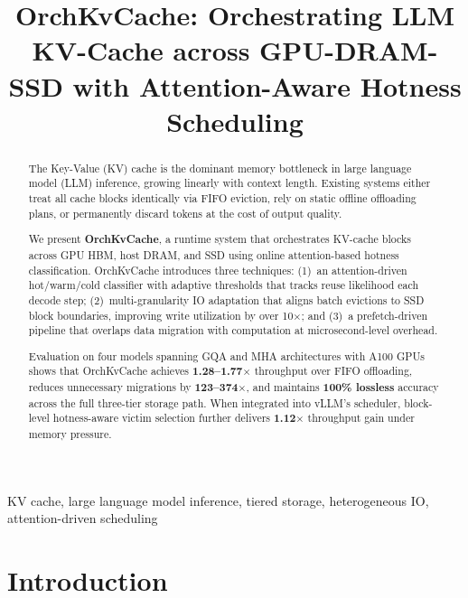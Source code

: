 \documentclass[conference]{IEEEtran}
\begin{document}
\title{OrchKvCache: Orchestrating LLM KV-Cache across GPU-DRAM-SSD with Attention-Aware Hotness Scheduling}

\author{
}

\maketitle

\begin{abstract}
The Key-Value (KV) cache is the dominant memory bottleneck in large language model (LLM) inference, growing linearly with context length. Existing systems either treat all cache blocks identically via FIFO eviction, rely on static offline offloading plans, or permanently discard tokens at the cost of output quality.

We present \textbf{OrchKvCache}, a runtime system that orchestrates KV-cache blocks across GPU HBM, host DRAM, and SSD using online attention-based hotness classification. OrchKvCache introduces three techniques: (1)~an attention-driven hot/warm/cold classifier with adaptive thresholds that tracks reuse likelihood each decode step; (2)~multi-granularity IO adaptation that aligns batch evictions to SSD block boundaries, improving write utilization by over 10$\times$; and (3)~a prefetch-driven pipeline that overlaps data migration with computation at microsecond-level overhead.

Evaluation on four models spanning GQA and MHA architectures with A100 GPUs shows that OrchKvCache achieves \textbf{1.28--1.77$\times$} throughput over FIFO offloading, reduces unnecessary migrations by \textbf{123--374$\times$}, and maintains \textbf{100\% lossless} accuracy across the full three-tier storage path. When integrated into vLLM's scheduler, block-level hotness-aware victim selection further delivers \textbf{1.12$\times$} throughput gain under memory pressure.
\end{abstract}

\begin{IEEEkeywords}
KV cache, large language model inference, tiered storage, heterogeneous IO, attention-driven scheduling
\end{IEEEkeywords}

\section{Introduction}
\end{document}
